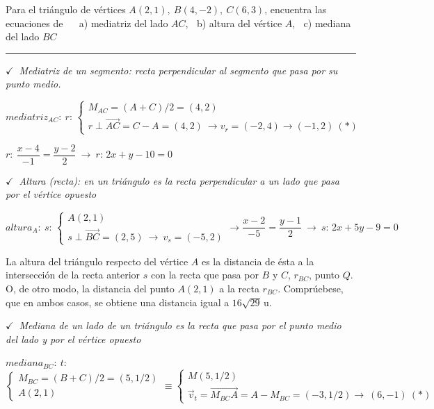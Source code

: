 \begin{miejercicio}

Para el triángulo de vértices $A(2,1),\ B(4,-2),\ C(6,3)$, encuentra las ecuaciones de $\quad $ a) mediatriz del lado $AC$, $\ $ b) altura del vértice $A$, $\ $ c) mediana del lado $BC$

\rule{250pt}{0.1pt}

\vspace{2mm} $\checkmark\ $ \emph{Mediatriz de un segmento: recta perpendicular al segmento que pasa por su punto medio.}

\vspace{2mm} $mediatriz_{AC}: \ r:\, \begin{cases} M_{AC}=(A+C)/2=(4,2) \\  r \perp \vec{AC} =C-A=(4,2) \ \to v_r=(-2,4)\to (-1,2) \ (*) \end{cases}$

\vspace{2mm} $r:\ \dfrac{x-4}{-1}=\dfrac{y-2}{2} \ \to \  r:\, 2x+y-10=0$

\vspace{5mm} $\checkmark\ $ \emph{Altura (recta): en un triángulo es la recta perpendicular a un lado que pasa por el vértice opuesto}

\vspace{2mm} $altura_{A}:\ s:\, \begin{cases} A(2,1) \\ s\perp \overrightarrow{BC}=(2,5)\ \to \ v_s=(-5,2) \end{cases} \to \dfrac{x-2}{-5}= \dfrac{y-1}{2} \ \to \ s:\, 2x+5y-9=0$

\vspace{2mm} \color{NavyBlue}La altura del triángulo respecto del vértice $A$ es la distancia de ésta a la intersección de la recta anterior $s$ con la recta que pasa por $B$ y $C$, $r_{BC}$, punto $Q$. O, de otro modo, la distancia del punto $A(2,1)$ a la recta $r_{BC}$. Comprúebese, que en ambos casos, se obtiene una distancia igual a $16\sqrt{29}\, \mathrm{u}$.\color{Black}

\vspace{5mm} $\checkmark\ $ \emph{Mediana de un lado de un triángulo es la recta que pasa por el punto medio del lado y por el vértice opuesto}

\vspace{2mm} \begin{footnotesize}$mediana_{BC}:\ t:\, $  $\begin{cases} M_{BC}=(B+C)/2=(5,1/2) \\ A(2,1) \end{cases} \equiv \begin{cases} M(5,1/2) \\ \vec v_t=\overrightarrow{M_{BC}A}=A-M_{BC}=(-3,1/2) \to \ (6,-1) \ (*) \end{cases} $\end{footnotesize} 


\end{miejercicio}
